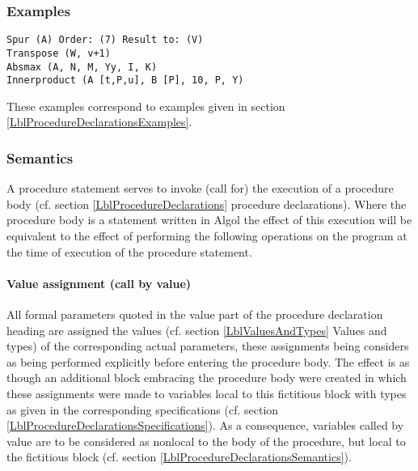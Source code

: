 \documentclass[a4paper,11pt]{article}
\begin{document}
\subsubsection{Examples}

\begin{flushleft}
\texttt{Spur (A) Order: (7) Result to: (V)\\
Transpose (W, v+1)\\
Absmax (A, N, M, Yy, I, K)\\
Innerproduct (A [t,P,u], B [P], 10, P, Y)}\\
\end{flushleft}

These examples correspond to examples given in section
\ref{LblProcedureDeclarationsExamples}.

\subsubsection{Semantics}
\label{LblProcedureStatementsSemantics}

A procedure statement serves to invoke (call for) the execution of a
procedure body (cf. section \ref{LblProcedureDeclarations} procedure
declarations).  Where the procedure body is a statement written in
Algol the effect of this execution will be equivalent to the effect of
performing the following operations on the program at the time of
execution of the procedure statement.

\paragraph{Value assignment (call by value)}
\label{LblProcedureStatementsSemanticsCallByValue}

All formal parameters quoted in the value part of the procedure
declaration heading are assigned the values (cf. section
\ref{LblValuesAndTypes} Values and types) of the corresponding actual
parameters, these assignments being considers as being performed
explicitly before entering the procedure body.  The effect is as
though an additional block embracing the procedure body were created
in which these assignments were made to variables local to this
fictitious block with types as given in the corresponding
specifications (cf. section
\ref{LblProcedureDeclarationsSpecifications}).  As a consequence,
variables called by value are to be considered as nonlocal to the body
of the procedure, but local to the fictitious block (cf. section
\ref{LblProcedureDeclarationsSemantics}).
\end{document}

